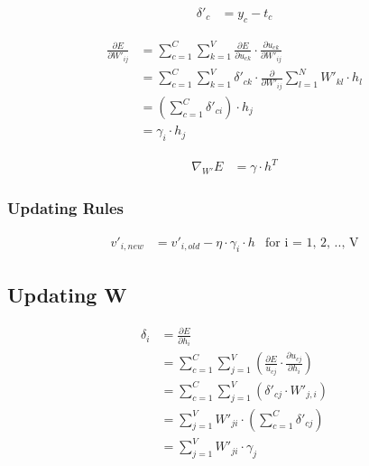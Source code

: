 \documentclass{article}
\begin{document}
	\begin{equation}
		\begin{aligned}
			\delta'_{c} &= y_{c} - t_{c} 
		\end{aligned}
	\end{equation}

	\begin{equation}
		\begin{aligned}
			\frac{\partial E}{\partial W'_{ij}} &= \sum_{c=1}^{C} \sum_{k=1}^{V} \frac{\partial E}{\partial u_{ck}} \cdot \frac{\partial u_{ck}}{\partial W'_{ij}} \\
			&= \sum_{c=1}^{C} \sum_{k=1}^{V} \delta'_{ck} \cdot \frac{\partial}{\partial W'_{ij}}\sum_{l=1}^{N} W'_{kl} \cdot h_l \\
			&= \left(\sum_{c=1}^{C} \delta'_{ci} \right)\cdot h_j \\
			&= \gamma_i \cdot h_j
		\end{aligned}	
	\end{equation}
	
	\begin{equation}
		\begin{aligned}
			\nabla_{W'} E &= \gamma \cdot h^T
		\end{aligned}	
	\end{equation}
	
	\subsubsection*{Updating Rules}
	\begin{framed}
	\begin{equation}
		\begin{aligned}
			v'_{i, new} &= v'_{i, old} - \eta \cdot \gamma_i \cdot h &\mbox{for i = 1, 2, .., V}
		\end{aligned}
	\end{equation}
	\end{framed}
	
	\subsection{Updating W}
	\begin{equation}
		\begin{aligned}
			\delta_i &= \frac{\partial E}{\partial h_i} \\
			&= \sum_{c=1}^{C}\sum_{j=1}^{V} \left( \frac{\partial E}{u_{cj}} \cdot \frac{\partial u_{cj}}{\partial h_i}\right)  \\
			&= \sum_{c=1}^{C}\sum_{j=1}^{V}\left( \delta'_{cj}\cdot W'_{j,i} \right)   \\
			&= \sum_{j=1}^{V} W'_{ji} \cdot \left(\sum_{c=1}^{C} \delta'_{cj} \right) \\
			&= \sum_{j=1}^{V} W'_{ji} \cdot \gamma_j
		\end{aligned}
	\end{equation}
	
\end{document}
